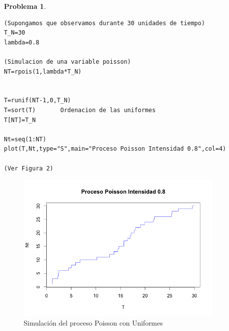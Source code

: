 \documentclass[a5paper,oneside]{amsart}
\theoremstyle{plain}
\theoremstyle{definition}
\newtheorem{problema}{Problema}
\begin{document}
\begin{problema}
\begin{enumerate}
\begin{lstlisting}
(Supongamos que observamos durante 30 unidades de tiempo)
T_N=30
lambda=0.8

(Simulacion de una variable poisson)
NT=rpois(1,lambda*T_N)


T=runif(NT-1,0,T_N)
T=sort(T) 		Ordenacion de las uniformes
T[NT]=T_N

Nt=seq(1:NT)
plot(T,Nt,type="S",main="Proceso Poisson Intensidad 0.8",col=4)

(Ver Figura 2)
\end{lstlisting}
 \begin{figure}
  \centering
    \includegraphics[width=0.9\textwidth]{Poisson2.png}
  \caption{ Simulaci\'on del proceso Poisson con Uniformes}
  \label{fig:ejemplo1}
\end{figure}

\end{enumerate}
\end{problema}
\end{document}
